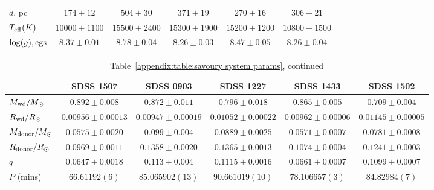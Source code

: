 \begin{landscape}
\begin{table}
\begin{tabular}{lccccc}
                \hline
                $d$, pc                     & $174\pm12$            & $504\pm30$            & $371\pm19$            & $270\pm16$            & $306\pm21$            \\
                $T_{\rm eff} (K)$           & $10000\pm1100$        & $15500\pm2400$        & $15300\pm1900$        & $15200\pm1200$        & $10800\pm1500$        \\
                $\log(g), {\rm cgs}$        & $8.37\pm0.01$         & $8.78\pm0.04$         & $8.26\pm0.03$         & $8.47\pm0.05$         & $8.26\pm0.04$         \\
                \hline
                \hline
            \end{tabular}
        \end{table}

        \begin{table}
            \caption{Table~\ref{appendix:table:savoury system params}, continued}
            \label{appendix:table:savoury system params cont 2}
            \begin{tabular}{lccccc}
                \hline
                ~                           & {\bf SDSS 1507}       & {\bf SDSS 0903}       & {\bf SDSS 1227}       & {\bf SDSS 1433}       & {\bf SDSS 1502}       \\
                \hline
                \hline
                $M_{\rm wd}/M_{\odot}$      & $0.892\pm0.008$       & $0.872\pm0.011$       & $0.796\pm0.018$       & $0.865\pm0.005$       & $0.709\pm0.004$       \\
                $R_{\rm wd}/R_{\odot}$      & $0.00956\pm0.00013$   & $0.00947\pm0.00019$   & $0.01052\pm0.00022$   & $0.00962\pm0.00006$   & $0.01145\pm0.00005$   \\
                $M_{\rm donor}/M_{\odot}$   & $0.0575\pm0.0020$     & $0.099\pm0.004$       & $0.0889\pm0.0025$     & $0.0571\pm0.0007$     & $0.0781\pm0.0008$     \\
                $R_{\rm donor}/R_{\odot}$   & $0.0969\pm0.0011$     & $0.1358\pm0.0020$     & $0.1365\pm0.0013$     & $0.1074\pm0.0004$     & $0.1241\pm0.0003$     \\
                $q$                         & $0.0647\pm0.0018$     & $0.113\pm0.004$       & $0.1115\pm0.0016$     & $0.0661\pm0.0007$     & $0.1099\pm0.0007$     \\
                \hline
                $P$ (mins)                  & $66.61192(6)$         & $85.065902(13)$       & $90.661019(10)$       & $78.106657(3)$        & $84.82984(7)$         \\

\end{tabular}
\end{table}
\end{landscape}

